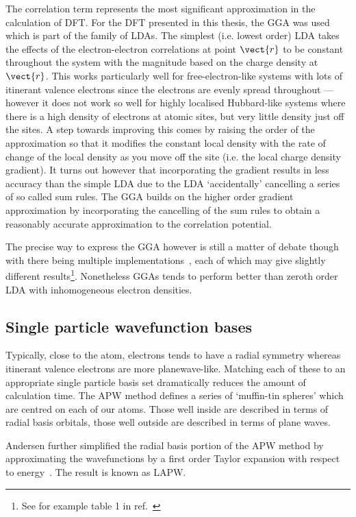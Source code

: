 The correlation term represents the most significant approximation in the calculation of \ac{DFT}. For the \ac{DFT} presented in this thesis, the \ac{GGA} was used which is part of the family of \acp{LDA}. The simplest (i.e. lowest order) \ac{LDA} takes the effects of the electron-electron correlations at point $\vect{r}$ to be constant throughout the system with the magnitude based on the charge density at $\vect{r}$. This works particularly well for free-electron-like systems with lots of itinerant valence electrons since the electrons are evenly spread throughout --- however it does not work so well for highly localised Hubbard-like systems where there is a high density of electrons at atomic sites, but very little density just off the sites. A step towards improving this comes by raising the order of the approximation so that it modifies the constant local density with the rate of change of the local density as you move off the site (i.e. the local charge density gradient). It turns out however that incorporating the gradient results in less accuracy than the simple \ac{LDA} due to the \ac{LDA} `accidentally' cancelling a series of so called sum rules. The \ac{GGA} builds on the higher order gradient approximation by incorporating the cancelling of the sum rules to obtain a reasonably accurate approximation to the correlation potential. 

The precise way to express the \ac{GGA} however is still a matter of debate though with there being multiple implementations~\cite{Perdew1996, Perdew1986}, each of which may give slightly different results\footnote{See for example table 1 in ref.~\cite{Perdew1996}}. Nonetheless \acp{GGA} tends to perform better than zeroth order \ac{LDA} with inhomogeneous electron densities.

\subsection{Single particle wavefunction bases}

Typically, close to the atom, electrons tends to have a radial symmetry whereas itinerant valence electrons are more planewave-like. Matching each of these to an appropriate single particle basis set dramatically reduces the amount of calculation time. The \ac{APW} method defines a series of `muffin-tin spheres' which are centred on each of our atoms. Those well inside are described in terms of radial basis orbitals, those well outside are described in terms of plane waves.

Andersen further simplified the radial basis portion of the \ac{APW} method by approximating the wavefunctions by a first order Taylor expansion with respect to energy~\cite{Andersen1975}. The result is known as \ac{LAPW}.

